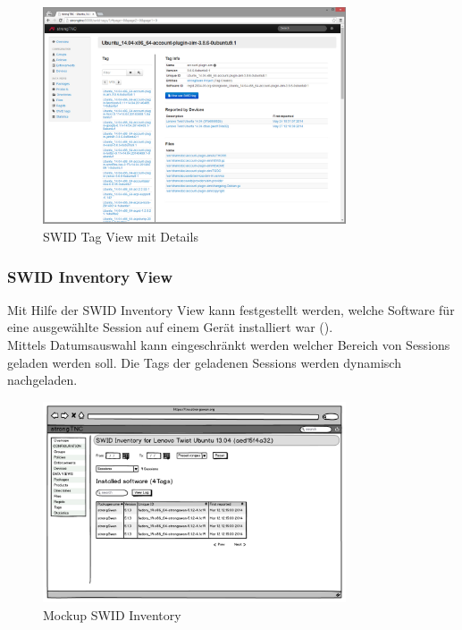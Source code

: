 \begin{figure}[H]
	\centering
	\includegraphics[width=0.8\textwidth]{./images/Views/tag-detail-view}
	\caption{SWID Tag View mit Details}
	\label{fig:swid-tag-view}
\end{figure}


\subsubsection{SWID Inventory View}
Mit Hilfe der SWID Inventory View kann festgestellt werden, welche Software für
eine ausgewählte Session auf einem Gerät installiert war
().\\
Mittels Datumsauswahl kann eingeschränkt werden welcher Bereich von Sessions
geladen werden soll. Die Tags der geladenen Sessions werden dynamisch
nachgeladen.

\begin{figure}[H]
	\centering
	\includegraphics[width=0.8\textwidth]{./images/mockups/swid-inventory}
	\caption{Mockup SWID Inventory}
	\label{fig:swid-inventory-view-mockup}
\end{figure}

